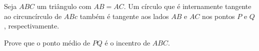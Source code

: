 Seja $ABC$ um triângulo com $AB = AC$. Um círculo que é internamente tangente ao circuncírculo de $ABc$ também é tangente aos lados $AB$ e $AC$ nos pontos $P$ e $Q$, respectivamente.

Prove que o ponto médio de $PQ$ é o incentro de $ABC$.

